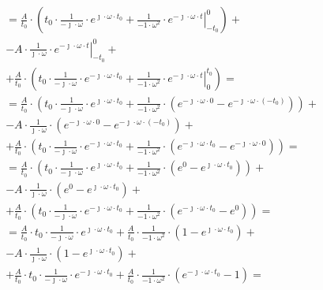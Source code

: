 \begin{task}
\begin{align*}
&=\frac{A}{t_0} \cdot \left(t_0 \cdot \frac{1}{-\jmath \cdot \omega} \cdot e^{\jmath \cdot \omega \cdot t_0} + \frac{1}{-1 \cdot \omega^2} \cdot \left. e^{-\jmath \cdot \omega \cdot t} \right|_{-t_0 }^{0} \right) + \\
&- A \cdot \frac{1}{\jmath \cdot \omega} \cdot \left. e^{-\jmath \cdot \omega \cdot t} \right|_{-t_0 }^{0} + \\
&+\frac{A}{t_0} \cdot \left( t_0 \cdot \frac{1}{-\jmath \cdot \omega} \cdot e^{-\jmath \cdot \omega \cdot t_0} + \frac{1}{-1 \cdot \omega^2} \cdot \left. e^{-\jmath \cdot \omega \cdot t} \right|_{0 }^{t_0} \right)  = \\
&=\frac{A}{t_0} \cdot \left(t_0 \cdot \frac{1}{-\jmath \cdot \omega} \cdot e^{\jmath \cdot \omega \cdot t_0} + \frac{1}{-1 \cdot \omega^2} \cdot \left( e^{-\jmath \cdot \omega \cdot 0} - e^{-\jmath \cdot \omega \cdot (-t_0)}\right) \right) + \\
&- A \cdot \frac{1}{\jmath \cdot \omega} \cdot \left( e^{-\jmath \cdot \omega \cdot 0} - e^{-\jmath \cdot \omega \cdot (-t_0)} \right) + \\
&+\frac{A}{t_0} \cdot \left( t_0 \cdot \frac{1}{-\jmath \cdot \omega} \cdot e^{-\jmath \cdot \omega \cdot t_0} + \frac{1}{-1 \cdot \omega^2} \cdot \left( e^{-\jmath \cdot \omega \cdot t_0} - e^{-\jmath \cdot \omega \cdot 0}\right) \right)  = \\
&=\frac{A}{t_0} \cdot \left(t_0 \cdot \frac{1}{-\jmath \cdot \omega} \cdot e^{\jmath \cdot \omega \cdot t_0} + \frac{1}{-1 \cdot \omega^2} \cdot \left( e^{0} - e^{\jmath \cdot \omega \cdot t_0}\right) \right) + \\
&- A \cdot \frac{1}{\jmath \cdot \omega} \cdot \left( e^{0} - e^{\jmath \cdot \omega \cdot t_0} \right) + \\
&+\frac{A}{t_0} \cdot \left( t_0 \cdot \frac{1}{-\jmath \cdot \omega} \cdot e^{-\jmath \cdot \omega \cdot t_0} + \frac{1}{-1 \cdot \omega^2} \cdot \left( e^{-\jmath \cdot \omega \cdot t_0} - e^{0}\right) \right)  = \\
&=\frac{A}{t_0} \cdot  t_0 \cdot \frac{1}{-\jmath \cdot \omega} \cdot e^{\jmath \cdot \omega \cdot t_0} + \frac{A}{t_0} \cdot \frac{1}{-1 \cdot \omega^2} \cdot \left( 1 - e^{\jmath \cdot \omega \cdot t_0}\right) + \\
&- A \cdot \frac{1}{\jmath \cdot \omega} \cdot \left( 1 - e^{\jmath \cdot \omega \cdot t_0} \right) + \\
&+\frac{A}{t_0} \cdot t_0 \cdot \frac{1}{-\jmath \cdot \omega} \cdot e^{-\jmath \cdot \omega \cdot t_0} + \frac{A}{t_0} \cdot \frac{1}{-1 \cdot \omega^2} \cdot \left( e^{-\jmath \cdot \omega \cdot t_0} - 1\right) = \\

\end{align*}
\end{task}
